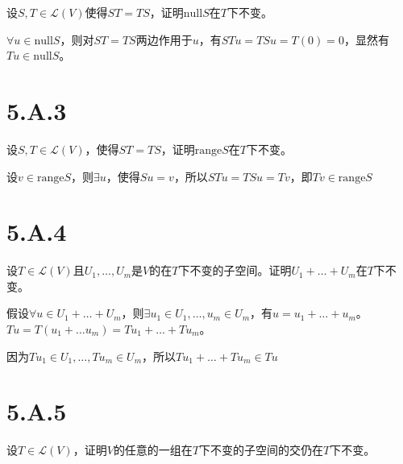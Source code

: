 \documentclass[10pt,a4paper,UTF8]{article}
\begin{document}
\begin{problem}
设\(S,T\in \mathcal{L}(V)\)使得\(ST = TS\)，证明\(\mathrm{null}S\)在\(T\)下不变。
\end{problem}

\begin{answer}
\(\forall u \in \mathrm{null}S\)，则对\(ST = TS\)两边作用于\(u\)，有\(STu = TSu = T(0) = 0\)，显然有\(Tu \in \mathrm{null} S\)。
\end{answer}

\section{5.A.3}
\label{sec:org41e4929}


\begin{problem}
设\(S,T\in \mathcal{L}(V)\)，使得\(ST = TS\)，证明\(\mathrm{range} S\)在\(T\)下不变。
\end{problem}

\begin{answer}
设\(v \in \mathrm{range}S\)，则\(\exists u\)，使得\(Su = v\)，所以\(STu = TSu = Tv\)，即\(Tv\in \mathrm{range} S\)
\end{answer}

\section{5.A.4}
\label{sec:org5a91724}


\begin{problem}
设\(T\in \mathcal{L}(V)\)且\(U_{1},\ldots ,U_{m}\)是\(V\)的在\(T\)下不变的子空间。证明\(U_{1} + \ldots + U_{m}\)在\(T\)下不变。
\end{problem}

\begin{answer}
假设\(\forall u \in U_{1} + \ldots + U_{m}\)，则\(\exists u_{1}\in U_{1},\ldots ,u_{m}\in U_{m}\)，有\(u = u_{1} + \ldots + u_{m}\)。\(Tu = T(u_{1} + \ldots u_{m}) = Tu_{1} + \ldots + Tu_{m}\)。

因为\(Tu_{1} \in U_{1},\ldots ,Tu_{m} \in U_{m}\)，所以\(Tu_{1} +\ldots + Tu_{m} \in Tu\)
\end{answer}

\section{5.A.5}
\label{sec:orgdead606}


\begin{problem}
设\(T\in \mathcal{L}(V)\)，证明\(V\)的任意的一组在\(T\)下不变的子空间的交仍在\(T\)下不变。
\end{problem}
\end{document}
